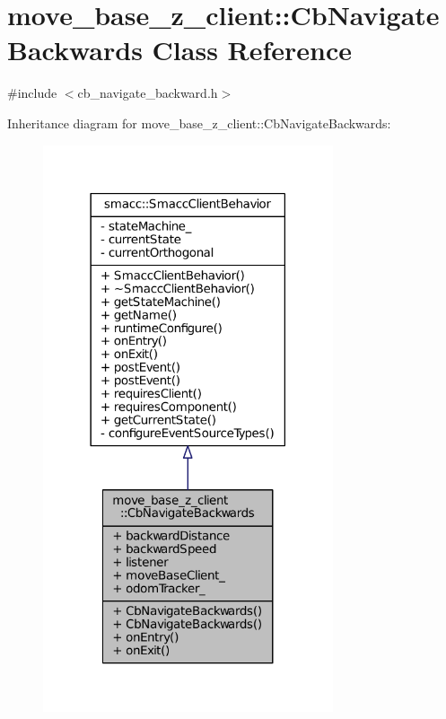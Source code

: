 \hypertarget{classmove__base__z__client_1_1CbNavigateBackwards}{}\section{move\+\_\+base\+\_\+z\+\_\+client\+:\+:Cb\+Navigate\+Backwards Class Reference}
\label{classmove__base__z__client_1_1CbNavigateBackwards}


{\ttfamily \#include $<$cb\+\_\+navigate\+\_\+backward.\+h$>$}



Inheritance diagram for move\+\_\+base\+\_\+z\+\_\+client\+:\+:Cb\+Navigate\+Backwards\+:
\nopagebreak
\begin{figure}[H]
\begin{center}
\leavevmode
\includegraphics[width=242pt]{classmove__base__z__client_1_1CbNavigateBackwards__inherit__graph}
\end{center}
\end{figure}


